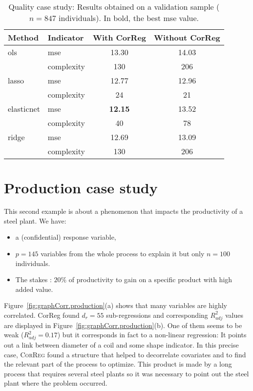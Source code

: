 \documentclass[12pt,a4paper]{report}
\begin{document}
		\begin{table}[h!]
\centering
\begin{tabular}{llcc}
	\hline
	Method& Indicator& With {\sc CorReg} & Without {\sc CorReg} \\ 
	\hline \hline
	{\sc ols} & {\sc mse} & 13.30 & 14.03 \\
		& complexity& 130 & 206 \\
	\hline
	{\sc lasso} & {\sc mse} & 12.77 & 12.96 \\
		& complexity& 24 & 21 \\
	\hline
	elasticnet & {\sc mse} & \textbf{12.15} & 13.52 \\
		& complexity& 40 & 78 \\
	\hline
	ridge & {\sc mse} & 12.69 & 13.09 \\
		& complexity& 130 & 206 \\
	\hline
\end{tabular} 
\caption{Quality case study: Results obtained on a validation sample ($n=847$ individuals). In bold, the best {\sc mse} value.}\label{Res_exfos}
\end{table}


		\FloatBarrier
		\section{Production case study}\label{sectionBV}
This second example is about a phenomenon that impacts the productivity of a steel plant.
We have:
		\begin{itemize}
			\item a (confidential)  response variable,
			\item $p=145$ variables from the whole process to explain it but only $n=100$ individuals.
			\item The stakes : $20\%$ of productivity to gain on a specific product with high added value.
		\end{itemize}
		
		
		
Figure~\ref{fig:graphCorr.production}(a) shows that many variables are highly correlated. {\sc CorReg} found $d_r=55$ sub-regressions and corresponding $R_{adj}^2$ values are displayed in Figure~\ref{fig:graphCorr.production}(b). One of them seems to be weak ($R_{adj}^2=0.17$) but it corresponds in fact to a non-linear regression: It points out a link between diameter of a coil and some shape indicator. In this precise case, \textsc{CorReg} found a structure that helped to decorrelate covariates and to find the relevant part of the process to optimize. This product is made by a long process that requires several steel plants so it was necessary to point out the steel plant where the problem occurred.	
		
\end{document}
